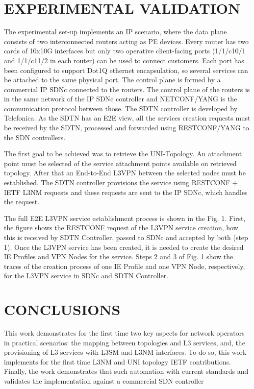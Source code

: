 \documentclass[conference]{IEEEtran}
\begin{document}
\section{EXPERIMENTAL VALIDATION}

The experimental set-up implements an IP scenario, where the data plane consists of two interconnected routers acting as PE devices. Every router has two cards of 10x10G interfaces but only two operative client-facing ports (1/1/c10/1 and 1/1/c11/2 in each router) can be used to connect customers. Each port has been configured to support Dot1Q ethernet encapsulation, so several services can be attached to the same physical port. The control plane is formed by a commercial IP SDNc connected to the routers. The control plane of the routers is in the same network of the IP SDNc controller and NETCONF/YANG is the communication protocol between those. The SDTN controller is developed by Telefonica. As the SDTN has an E2E view, all the services creation requests must be received by the SDTN, processed and forwarded using RESTCONF/YANG to the SDN controllers.

The first goal to be achieved was to retrieve the UNI-Topology. An attachment point must be selected of the service attachment points available on retrieved topology. After that an End-to-End L3VPN between the selected nodes must be established. The SDTN controller provisions the service using RESTCONF + IETF L3NM requests and these requests are sent to the IP SDNc, which handles the request.

The full E2E L3VPN service establishment process is shown in the Fig. 1. First, the figure shows the RESTCONF request of the L3VPN service creation, how this is received by SDTN Controller, passed to SDNc and accepted by both (step 1). Once the L3VPN service has been created, it is needed to create the desired IE Profiles and VPN Nodes for the service. Steps 2 and 3 of Fig. 1 show the traces of the creation process of one IE Profile and one VPN Node, respectively, for the L3VPN service in SDNc and SDTN Controller.

\section{CONCLUSIONS}

This work demonstrates for the first time two key aspects for network operators in practical scenarios: the mapping between topologies and L3 services, and,  the provisioning of L3 services with L3SM and L3NM interfaces. To do so, this work  implements for the first time L3NM and UNI topology IETF contributions. Finally, the work demonstrates that such automation with current standards and validates the implementation against a commercial SDN controller
\end{document}
